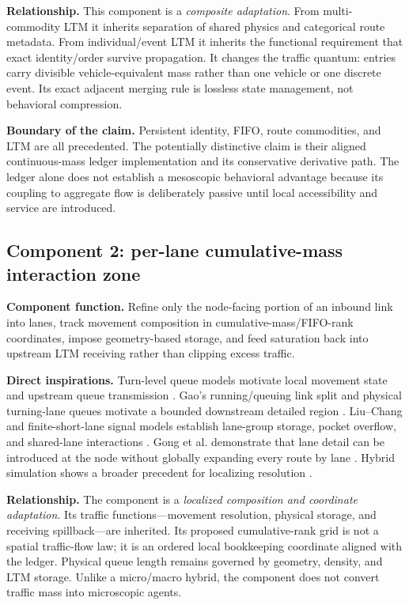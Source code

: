 \documentclass[11pt,a4paper]{article}
\begin{document}
\textbf{Relationship.} This component is a \emph{composite adaptation}. From multi-commodity LTM it inherits separation of shared physics and categorical route metadata. From individual/event LTM it inherits the functional requirement that exact identity/order survive propagation. It changes the traffic quantum: entries carry divisible vehicle-equivalent mass rather than one vehicle or one discrete event. Its exact adjacent merging rule is lossless state management, not behavioral compression.

\textbf{Boundary of the claim.} Persistent identity, FIFO, route commodities, and LTM are all precedented. The potentially distinctive claim is their aligned continuous-mass ledger implementation and its conservative derivative path. The ledger alone does not establish a mesoscopic behavioral advantage because its coupling to aggregate flow is deliberately passive until local accessibility and service are introduced.

\subsection{Component 2: per-lane cumulative-mass interaction zone}

\textbf{Component function.} Refine only the node-facing portion of an inbound link into lanes, track movement composition in cumulative-mass/FIFO-rank coordinates, impose geometry-based storage, and feed saturation back into upstream LTM receiving rather than clipping excess traffic.

\textbf{Direct inspirations.} Turn-level queue models motivate local movement state and upstream queue transmission \cite{wei2025}. Gao's running/queuing link split and physical turning-lane queues motivate a bounded downstream detailed region \cite{gao2012}. Liu--Chang and finite-short-lane signal models establish lane-group storage, pocket overflow, and shared-lane interactions \cite{liu2011,wang2020}. Gong et al. demonstrate that lane detail can be introduced at the node without globally expanding every route by lane \cite{gong2025}. Hybrid simulation shows a broader precedent for localizing resolution \cite{son2022}.

\textbf{Relationship.} The component is a \emph{localized composition and coordinate adaptation}. Its traffic functions---movement resolution, physical storage, and receiving spillback---are inherited. Its proposed cumulative-rank grid is not a spatial traffic-flow law; it is an ordered local bookkeeping coordinate aligned with the ledger. Physical queue length remains governed by geometry, density, and LTM storage. Unlike a micro/macro hybrid, the component does not convert traffic mass into microscopic agents.
\end{document}
